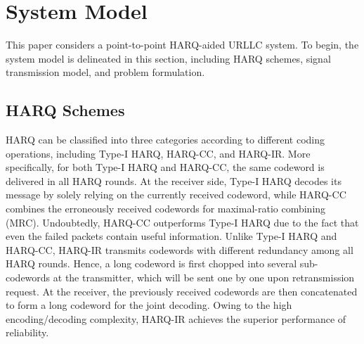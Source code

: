 \documentclass[conference]{IEEEtran}
\begin{document}
\section{System Model}\label{sec:model}
This paper considers a point-to-point HARQ-aided URLLC system. To begin, the system model is delineated in this section, including HARQ schemes, signal transmission model, and problem formulation.
\subsection{HARQ Schemes}
HARQ can be classified into three categories according to different coding operations, including Type-I HARQ, HARQ-CC, and HARQ-IR. More specifically, for both Type-I HARQ and HARQ-CC, the same codeword is delivered in all HARQ rounds. At the receiver side, Type-I HARQ decodes its message by solely relying on the currently received codeword, while HARQ-CC combines the erroneously received codewords for maximal-ratio combining (MRC). Undoubtedly, HARQ-CC outperforms Type-I HARQ due to the fact that even the failed packets contain useful information. Unlike Type-I HARQ and HARQ-CC, HARQ-IR transmits codewords with different redundancy among all HARQ rounds. Hence, a long codeword is first chopped into several sub-codewords at the transmitter, which will be sent one by one upon retransmission request. At the receiver, the previously received codewords are then concatenated to form a long codeword for the joint decoding. Owing to the high encoding/decoding complexity, HARQ-IR achieves the superior performance of reliability.

\end{document}
